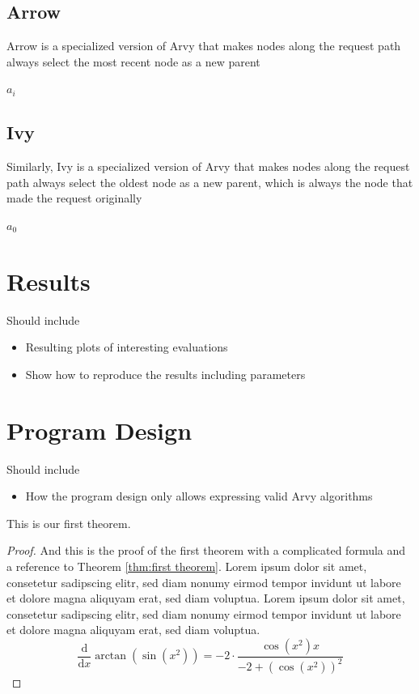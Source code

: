 \documentclass[a4paper, oneside]{discothesis}
\begin{document}
\section{Arrow}

Arrow is a specialized version of Arvy that makes nodes along the request path always select the most recent node as a new parent
\begin{algorithmic}
\State\Return $a_i$
\EndFunction
\end{algorithmic}

\section{Ivy}

Similarly, Ivy is a specialized version of Arvy that makes nodes along the request path always select the oldest node as a new parent, which is always the node that made the request originally
\begin{algorithmic}
\State\Return $a_0$
\EndFunction
\end{algorithmic}

\chapter{Results}

Should include
\begin{itemize}
\item Resulting plots of interesting evaluations
\item Show how to reproduce the results including parameters
\end{itemize}

\chapter{Program Design}

Should include
\begin{itemize}
\item How the program design only allows expressing valid Arvy algorithms
\end{itemize}


\begin{theorem}\label{thm:first theorem}
	This is our first theorem.
\end{theorem}

\begin{proof}
	And this is the proof of the first theorem with a complicated formula and a reference to Theorem \ref{thm:first theorem}. Lorem ipsum dolor sit amet, consetetur sadipscing elitr, sed diam nonumy eirmod tempor invidunt ut labore et dolore magna aliquyam erat, sed diam voluptua. Lorem ipsum dolor sit amet, consetetur sadipscing elitr, sed diam nonumy eirmod tempor invidunt ut labore et dolore magna aliquyam erat, sed diam voluptua.
	\begin{equation}
		{\frac {\mathrm d}{\mathrm dx}}\arctan(\sin({x}^{2}))=-2 \cdot {\frac {\cos({x}^{2})x}{-2+\left (\cos({x}^{2})\right )^{2}}}
	\end{equation}	
\end{proof}
\end{document}
